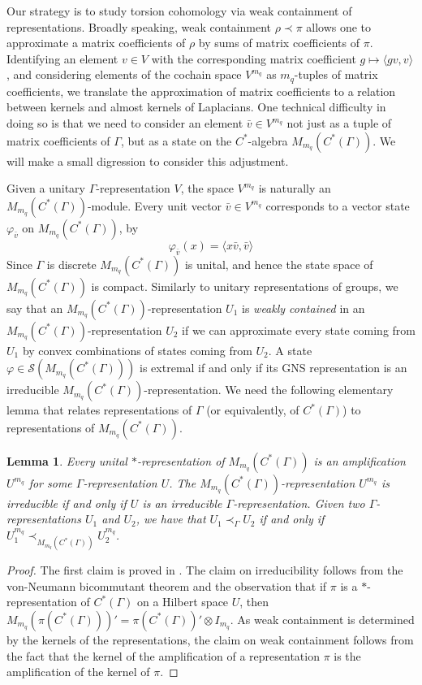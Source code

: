 \documentclass[12pt,reqno]{amsart}
\newtheorem{lemma}[theorem]{Lemma}
\theoremstyle{definition}
\begin{document}
Our strategy is to study torsion cohomology via weak containment of representations. Broadly speaking, weak containment  $\rho \prec \pi$ allows one to approximate a matrix coefficients of $\rho$ by sums of matrix coefficients of $\pi$. Identifying an element $v \in V$ with the corresponding matrix coefficient $g \mapsto \langle gv,v \rangle$, and considering elements of the cochain space $V^{m_q}$ as $m_q$-tuples of matrix coefficients, we translate the approximation of matrix coefficients to a relation between kernels and almost kernels of Laplacians. One technical difficulty in doing so is that we need to consider an element $\bar{v} \in V^{m_q}$ not just as a tuple of matrix coefficients of $\Gamma$, but as a state on the $C^*$-algebra $M_{m_q}(C^*(\Gamma))$. We will make a small digression to consider this adjustment. 

Given a unitary $\Gamma$-representation $V$, the space $V^{m_q}$ is naturally an $M_{m_q}(C^*(\Gamma))$-module. Every unit vector $\bar{v} \in V^{m_q}$ corresponds to a vector state $\varphi_{\bar{v}}$ on $M_{m_q}(C^*(\Gamma))$, by
$$\varphi_{\bar{v}}(x)=\langle x\bar{v},\bar{v}\rangle$$ 
Since $\Gamma$ is discrete $M_{m_q}(C^*(\Gamma))$ is unital, and hence the state space of $M_{m_q}(C^*(\Gamma))$ is compact. Similarly to unitary representations of groups, we say that an $M_{m_q}(C^*(\Gamma))$-representation $U_1$ is \emph{weakly contained} in an $M_{m_q}(C^*(\Gamma))$-representation $U_2$ if we can approximate every state coming from $U_1$ by convex combinations of states coming from $U_2$. A state $\varphi \in \mathcal S (M_{m_q}(C^*(\Gamma)))$ is extremal if and only if its GNS representation is an irreducible $M_{m_q}(C^*(\Gamma))$-representation. We need the following elementary lemma that relates representations of $\Gamma$ (or equivalently, of $C^*(\Gamma)$) to representations of $M_{m_q}(C^*(\Gamma))$.
\begin{lemma}\label{lemma:reps of amplification}
    Every unital $*$-representation of $M_{m_q}(C^*(\Gamma))$ is an amplification $U^{m_q}$ for some $\Gamma$-representation $U$. The $M_{m_q}(C^*(\Gamma))$-representation $U^{m_q}$ is irreducible if and only if $U$ is an irreducible $\Gamma$-representation. Given two $\Gamma$-representations $U_1$ and $U_2$, we have that $U_1 \prec_\Gamma U_2$ if and only if $U_1^{m_q} \prec_{M_{m_q}(C^*(\Gamma))} U_2^{m_q}$. 
\end{lemma}

\begin{proof}
    The first claim is proved in \cite[Proposition~12]{BaderNowak}. The claim on irreducibility follows from the von-Neumann bicommutant theorem and the observation that if $\pi$ is a $*$-representation of $C^*({\Gamma})$ on a Hilbert space $U$, then $M_{m_q}(\pi(C^*(\Gamma)))' = \pi(C^*(\Gamma))'\otimes I_{m_q}$. As weak containment is determined by the kernels of the representations, the claim on weak containment follows from the fact that the kernel of the amplification of a representation $\pi$ is the amplification of the kernel of $\pi$.
\end{proof}
\end{document}
